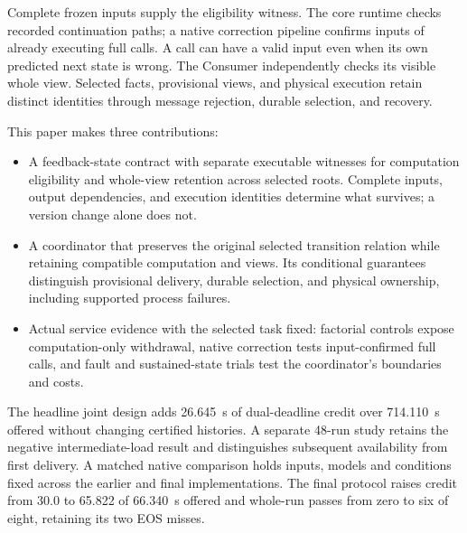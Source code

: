 Complete frozen inputs supply the eligibility witness. The core runtime
checks recorded continuation paths; a native correction pipeline confirms
inputs of already executing full calls. A call can have a valid input
even when its own predicted next state is wrong. The Consumer independently
checks its visible whole view. Selected facts, provisional views, and
physical execution retain distinct identities through message rejection,
durable selection, and recovery.

This paper makes three contributions:
\begin{itemize}
\item A feedback-state contract with separate executable witnesses for
  computation eligibility and whole-view retention across selected roots.
  Complete inputs, output dependencies, and execution identities determine
  what survives; a version change alone does not.
\item A coordinator that preserves the original selected transition relation
  while retaining compatible computation and views. Its conditional
  guarantees distinguish provisional delivery, durable selection, and
  physical ownership, including supported process failures.
\item Actual service evidence with the selected task fixed: factorial
  controls expose computation-only withdrawal, native correction tests
  input-confirmed full calls, and fault and sustained-state trials test
  the coordinator's boundaries and costs.
\end{itemize}

The headline joint design adds 26.645~s of dual-deadline credit over
714.110~s offered without changing certified histories. A separate 48-run
study retains the negative intermediate-load result and distinguishes
subsequent availability from first delivery. A matched native comparison
holds inputs, models and conditions fixed across the earlier and final
implementations. The final protocol raises credit from 30.0 to 65.822
of 66.340~s offered and whole-run passes from zero to six of eight,
retaining its two EOS misses.

